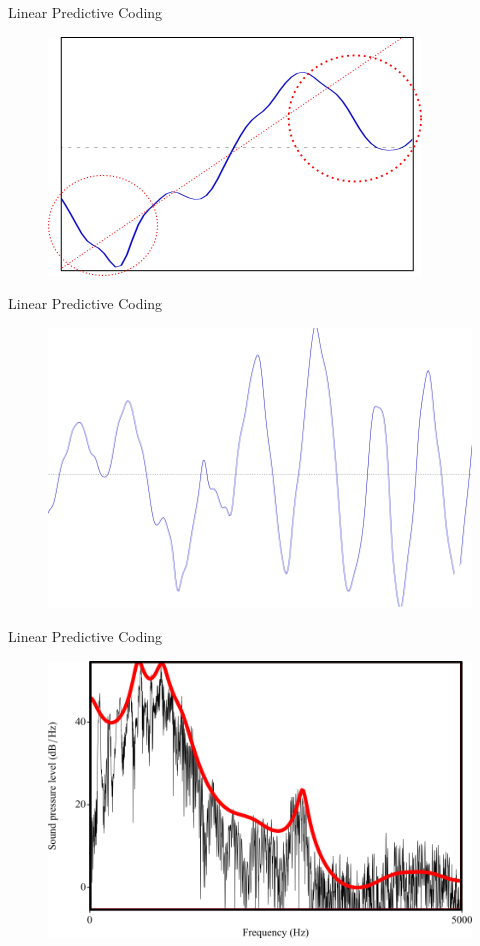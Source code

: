 \documentclass{beamer}
\begin{document}
\begin{frame}
Linear Predictive Coding
\begin{figure}
\includegraphics[scale=0.5]{largest_errors.png}
\end{figure}
\end{frame}
\begin{frame}
Linear Predictive Coding
\begin{figure}
\includegraphics[scale=0.5]{signal.png}
\end{figure}
\end{frame}
\begin{frame}
Linear Predictive Coding
\begin{figure}
\includegraphics[scale=0.5]{smoothed_spectrum.png}
\end{figure}
\end{frame}
\end{document}
